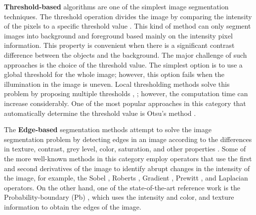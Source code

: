 \textbf{Threshold-based} algorithms are one of the simplest image segmentation techniques. The threshold operation divides the image by comparing the intensity of the pixels to a specific threshold value \citep{Sezgin.Sankur:EI:2010}. This kind of method can only segment images into background and foreground based mainly on the intensity pixel information. This property is convenient when there is a significant contrast difference between the objects and the background. The major challenge of such approaches is the choice of the threshold value. The simplest option is to use a global threshold for the whole image; however, this option fails when the illumination in the image is uneven. Local thresholding methods solve this problem by proposing multiple thresholds \citep{Niblack:ImageProcc:1986}, \citep{Sauvola.Pietikainen:ICPR:2000}; however, the computation time can increase considerably. One of the most popular approaches in this category that automatically determine the threshold value is Otsu's method \citep{Otsu:SMC:1979}.

The \textbf{Edge-based} segmentation methods attempt to solve the image segmentation problem by detecting edges in an image according to the differences in texture, contrast, grey level, color, saturation, and other properties \citep{Saini.Arora:IJICT:2014}. Some of the more well-known methods in this category employ operators that use the first and second derivatives of the image to identify abrupt changes in the intensity of the image, for example, the Sobel \citep{Sobel.Feldman:SAIL:1990}, Roberts \citep{Roberts:Thesis:1963}, Gradient \citep{Maitre:Book:2003}, Prewitt \citep{Prewitt:PPP:1970}, and Laplacian \citep{Marr.Hildreth:PRS:1980} operators. On the other hand, one of the state-of-the-art reference work is the Probability-boundary (Pb) \citep{Malik.Belongie.ea:IJCV:2001},  which uses the intensity and color, and texture information to obtain the edges of the image. 

